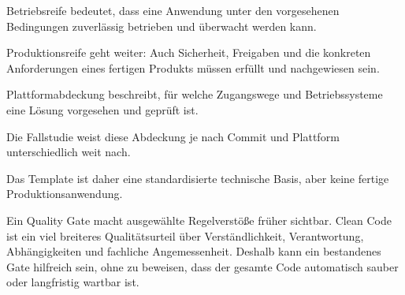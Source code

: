 \begin{beginnerstatement}

Betriebsreife bedeutet, dass eine Anwendung unter den vorgesehenen
Bedingungen zuverlässig betrieben und überwacht werden kann.

Produktionsreife geht weiter: Auch Sicherheit, Freigaben und die konkreten
Anforderungen eines fertigen Produkts müssen erfüllt und nachgewiesen sein.

Plattformabdeckung beschreibt, für welche Zugangswege und Betriebssysteme eine
Lösung vorgesehen und geprüft ist.

Die Fallstudie weist diese Abdeckung je nach Commit und Plattform
unterschiedlich weit nach.

Das Template ist daher eine standardisierte technische Basis, aber keine
fertige Produktionsanwendung.

Ein Quality Gate macht ausgewählte Regelverstöße früher sichtbar. Clean Code
ist ein viel breiteres Qualitätsurteil über Verständlichkeit, Verantwortung,
Abhängigkeiten und fachliche Angemessenheit. Deshalb kann ein bestandenes Gate
hilfreich sein, ohne zu beweisen, dass der gesamte Code automatisch sauber oder
langfristig wartbar ist.

\end{beginnerstatement}
